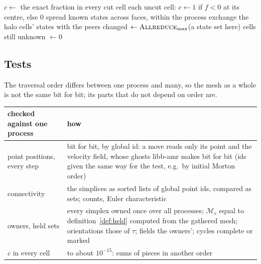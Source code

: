 \documentclass[10pt,a4paper]{article}
\theoremstyle{definition}
\begin{document}
\begin{algorithm}[H]
  \caption{\textsc{InitialC}}
  \label{alg:initc}
  \begin{algorithmic}[1]
    \State $c \gets$ the exact fraction in every cut cell 
      \State each uncut cell: $c \gets 1$ if $f < 0$ at its centre, else 0
    \Else {}
      \Repeat
        \State spread known states across faces, within the process
        \State exchange the halo cells' states with the peers
        \State changed $\gets \textsc{Allreduce}_{\max}$(a state set here)
      \State cells still unknown $\gets 0$ 
    \EndIf
  \end{algorithmic}
\end{algorithm}

\subsection{Tests}
\label{sec:part-test}

The traversal order differs between one process and many, so the mesh as
a whole is not the same bit for bit; its parts that do not depend on order
are.

\begin{center}
\small
\begin{tabularx}{\textwidth}{@{}>{\raggedright}p{}X@{}}
  \toprule
  checked against one process & how \\
  \midrule
  point positions, every step & bit for bit, by global id: a move reads
    only its point and the velocity field, whose ghosts libb-amr makes
    bit for bit (ids given the same way for the test, e.g.\ by initial
    Morton order) \\
  connectivity & the simplices as sorted lists of global point ids,
    compared as sets; counts, Euler characteristic \\
  owners, held sets & every simplex owned once over all processes;
    $\mathcal{M}_r$ equal to definition~\ref{def:held} computed from the
    gathered mesh; orientations those of $\tau$; fields the owners';
    cycles complete or marked \\
  $c$ in every cell & to about $10^{-15}$: sums of pieces in another
    order \\
  \bottomrule
\end{tabularx}
\end{center}
\end{document}
